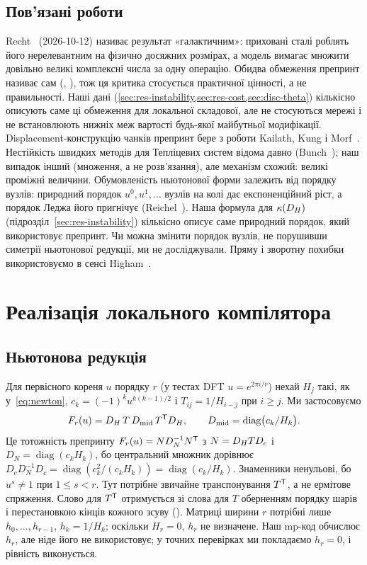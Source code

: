 \documentclass[11pt]{article}
\theoremstyle{plain}
\DeclareMathOperator{\diag}{diag}
\begin{document}
\subsection{Пов'язані роботи}\label{sec:related}
Recht~\citep{recht2026} (2026-10-12) називає результат «галактичним»: приховані сталі роблять його нерелевантним на фізично досяжних розмірах, а модель вимагає множити довільно великі комплексні числа за одну операцію. Обидва обмеження препринт називає сам (, ), тож ця критика стосується практичної цінності, а не правильності. Наші дані (\cref{sec:res-instability,sec:res-cost,sec:disc-theta}) кількісно описують саме ці обмеження для локальної складової, але не стосуються мережі і не встановлюють нижніх меж вартості будь-якої майбутньої модифікації. Displacement-конструкцію чанків препринт бере з роботи Kailath, Kung і Morf~\citep{kailath1979}. Нестійкість швидких методів для Тепліцевих систем відома давно (Bunch~\citep{bunch1985}); наш випадок інший (множення, а не розв'язання), але механізм схожий: великі проміжні величини. Обумовленість ньютонової форми залежить від порядку вузлів: природний порядок $u^0,u^1,\dots$ вузлів на колі дає експоненційний ріст, а порядок Леджа його пригнічує (Reichel~\citep{reichel1990}). Наша формула для $\kappa(D_H)$ (підрозділ~\ref{sec:res-instability}) кількісно описує саме природний порядок, який використовує препринт. Чи можна змінити порядок вузлів, не порушивши симетрії ньютонової редукції, ми не досліджували. Пряму і зворотну похибки використовуємо в сенсі Higham~\citep{higham2002}.

\section{Реалізація локального компілятора}\label{sec:impl}

\subsection{Ньютонова редукція}\label{sec:newton}
Для первісного кореня $u$ порядку $r$ (у тестах DFT $u=e^{2\pi i/r}$) нехай $H_j$ такі, як у~\eqref{eq:newton}, $c_k=(-1)^ku^{k(k-1)/2}$ і $T_{ij}=1/H_{i-j}$ при $i\ge j$. Ми застосовуємо
\begin{equation}\label{eq:chain}
F_r(u)=\Dh\,T\,\Dmid\,T^{\T}\Dh,\qquad \Dmid=\diag\bigl(c_k/H_k\bigr).
\end{equation}
Це тотожність препринту $F_r(u)=ND_N^{-1}N^{\mathsf{T}}$ з $N=D_H TD_c$ і $D_N=\diag(c_kH_k)$, бо центральний множник дорівнює $D_cD_N^{-1}D_c=\diag(c_k^2/(c_kH_k))=\diag(c_k/H_k)$. Знаменники ненульові, бо $u^s\ne1$ при $1\le s<r$. Тут потрібне звичайне транспонування $T^{\mathsf{T}}$, а не ермітове спряження. Слово для $T^{\mathsf{T}}$ отримується зі слова для $T$ оберненням порядку шарів і перестановкою кінців кожного зсуву (). Матриці ширини $r$ потрібні лише $h_0,\dots,h_{r-1}$, $h_k=1/H_k$; оскільки $H_r=0$, $h_r$ не визначене. Наш mp-код обчислює $h_r$, але ніде його не використовує; у точних перевірках ми покладаємо $h_r=0$, і рівність виконується.
\end{document}

